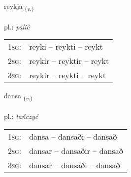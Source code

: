 \documentclass[frontgrid, backgrid]{flacards}\usepackage[]{graphicx}\usepackage[]{xcolor}
\begin{document}
\renewcommand{\flhead}{\vskip5pt \fboxsep=0pt {\small\bfseries\footnotesize Sagnorð | Verb}}
\renewcommand{\fcfoot}{\vskip5pt \fboxsep=0pt \hspace{2pt}{\small\bfseries\footnotesize 2K}}

\renewcommand{\blhead}{\vskip5pt {\small\bfseries\footnotesize Sagnorð | Verb }}
\renewcommand{\bcfoot}{\vskip5pt \hspace{2pt}{\small\bfseries\footnotesize 2K}}


{reykja \small{\textsubscript{(\textit{v.})}} \\[1ex] %
\textphonetic{[reiːca]} \\
pl.: \emph{palić} \\  [2ex]
\renewcommand*{\arraystretch}{0.8}
\begin{tabular}{p{1cm}l}
\textsc{1sg}: & reyki -- reykti -- reykt \\ 
\textsc{2sg}: & reykir -- reyktir -- reykt \\ 
\textsc{3sg}: & reykir -- reykti -- reykt \\ 
\end{tabular}
}

\renewcommand{\flhead}{\vskip5pt \fboxsep=0pt {\small\bfseries\footnotesize Sagnorð | Verb}}
\renewcommand{\fcfoot}{\vskip5pt \fboxsep=0pt \hspace{2pt}{\small\bfseries\footnotesize 2K}}

\renewcommand{\blhead}{\vskip5pt {\small\bfseries\footnotesize Sagnorð | Verb }}
\renewcommand{\bcfoot}{\vskip5pt \hspace{2pt}{\small\bfseries\footnotesize 2K}}


{dansa \small{\textsubscript{(\textit{v.})}} \\[1ex] %
\textphonetic{[tansa]} \\
pl.: \emph{tańczyć} \\  [2ex]
\renewcommand*{\arraystretch}{0.8}
\begin{tabular}{p{1cm}l}
\textsc{1sg}: & dansa -- dansaði -- dansað \\ 
\textsc{2sg}: & dansar -- dansaðir -- dansað \\ 
\textsc{3sg}: & dansar -- dansaði -- dansað \\ 
\end{tabular}
}
\end{document}
